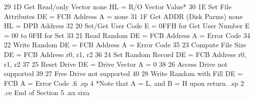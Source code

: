 29          1D   Get Read/only Vector    none                   HL = R/O
                                                                 Vector Value*
30          1E   Set File Attributes     DE = FCB Address       A = none
31          1F   Get ADDR (Disk Parms)   none                   HL = DPB
                                                                 Address
32          20   Set/Get User Code       E = 0FFH for Get       User Number
                                         E = 00 to 0FH for Set
33          21   Read Random             DE = FCB Address       A = Error Code
34          22   Write Random            DE = FCB Address       A = Error Code
35          23   Compute File Size       DE = FCB Address       r0, r1, r2
36          24   Set Random Record       DE = FCB Address       r0, r1, r2
37          25   Reset Drive             DE = Drive Vector      A = 0
38          26   Access Drive            not supported
39          27   Free Drive              not supported
40          28   Write Random with Fill  DE = FCB               A = Error Code
.fi
.sp 4
*Note that A = L, and B = H upon return.
.sp 2
.ce
End of Section 5
.nx sixa
